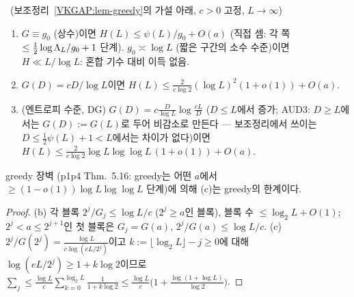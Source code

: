 \begin{corollary}[S3의 세 영역]\label{VKGAP:cor-regimes}
\PROVED\ (보조정리~\ref{VKGAP:lem-greedy}의 가설 아래, $c>0$ 고정, $L\to\infty$)
\begin{enumerate}[label=(\alph*)]
\item $G\equiv g_0$ (상수)이면 $H(L)\le\psi(L)/g_0+O(a)$ (직접 셈: 각 쪽 $\le\frac12\log\Lambda_L/g_0+1$ 단계). $g_0\asymp\log L$ (짧은 구간의 소수 수준)이면
$H\ll L/\log L$: 혼합 기수 대비 이득 없음.
\item $G(D)=cD/\log L$이면 $H(L)\le\frac{2}{c\log2}(\log L)^2(1+o(1))+O(a)$.
\item (엔트로피 수준, DG) $G(D)=c\frac{D}{\log L}\log\frac{eL}{D}$ ($D\le L$에서 증가; AUD3: $D\ge L$에서는 $G(D):=G(L)$로 두어 비감소로 만든다 --- 보조정리에서 쓰이는 $D\le\frac12\psi(L)+1<L$에서는 차이가 없다)이면
$H(L)\le\frac{2}{c\log2}\log L\log\log L\,(1+o(1))+O(a)$.
\end{enumerate}
greedy 장벽 (p1p4 Thm.~5.16: greedy는 어떤 $a$에서 $\ge(1-o(1))\log L\log\log L$ 단계)에 의해 (c)는 greedy의 한계이다.
\end{corollary}
\begin{proof}
(b) 각 블록 $2^j/G_j\le\log L/c$ ($2^j\ge a$인 블록), 블록 수 $\le\log_2L+O(1)$; $2^j<a\le2^{j+1}$인 첫 블록은 $G_j=G(a)$, $2^j/G(a)\le\log L/c$.
(c) $2^j/G(2^j)=\frac{\log L}{c\log(eL/2^j)}$이고 $k:=\lfloor\log_2L\rfloor-j\ge0$에 대해 $\log(eL/2^j)\ge1+k\log2$이므로
$\sum_j\le\frac{\log L}{c}\sum_{k=0}^{\log_2L}\frac1{1+k\log2}\le\frac{\log L}{c}\big(1+\frac{\log(1+\log L)}{\log2}\big)$.
\end{proof}


